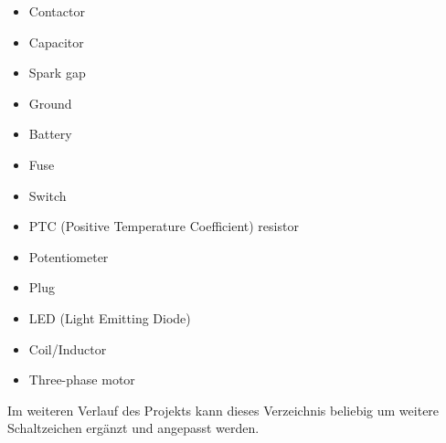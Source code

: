 \begin{multicols}{2}
	\begin{itemize}
		\item Contactor
		\item Capacitor
		\item Spark gap
		\item Ground
		\item Battery
		\item Fuse
		\item Switch
	\end{itemize}
	\columnbreak
	\begin{itemize}
\item PTC (Positive Temperature Coefficient) resistor
\item Potentiometer
\item Plug
\item LED (Light Emitting Diode)
\item Coil/Inductor
\item Three-phase motor
	\end{itemize}
\end{multicols}

Im weiteren Verlauf des Projekts kann dieses Verzeichnis beliebig um weitere Schaltzeichen ergänzt und angepasst werden.

